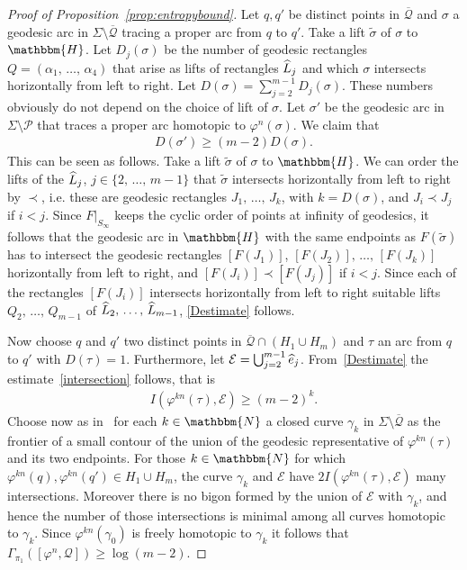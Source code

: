 \documentclass[AHL,Unicode,longabstracts,published]{cedram}
\newcommand{\N}{\mathbbm{N}}
\newcommand{\Hy}{\mathbbm{H}}
\newcommand{\clP}{\mathcal{P}}
\newcommand{\clQ}{\mathcal{Q}}
\newcommand{\clE}{\mathcal{E}}
\newcounter{claim}
\let\oldhat\hat
\renewcommand*{\hat}[1]{\mathchoice{\widehat{#1}}{\widehat{#1}}{\oldhat{#1}}{\oldhat{#1}}}
\begin{document}
\begin{proof}[Proof of Proposition~\ref{prop:entropybound}]
Let $q, q'$ be distinct points in $\overline{\clQ}$ and $\sigma$ a geodesic arc in $\Sigma \setminus \overline{\clQ}$ tracing a proper arc from $q$ to $q'$. Take a lift $\widetilde{\sigma}$ of $\sigma$ to $\Hy$. Let $D_j(\sigma)$ be the number of geodesic rectangles $Q=(\alpha_1,\, \ldots,\, \alpha_4)$ that arise as lifts of rectangles $\hat{L}_j$ and which $\sigma$ intersects horizontally from left to right. Let $D(\sigma) = \sum_{j=2}^{m-1} D_j(\sigma)$. These numbers obviously do not depend on the choice of lift of $\sigma$. Let $\sigma'$ be the geodesic arc in $\Sigma \setminus \clP$ that traces a proper arc homotopic to $\varphi^n(\sigma)$. We claim that
\begin{align}\label{Destimate}
D(\sigma') \geq (m-2)D(\sigma).
\end{align}
This can be seen as follows. Take a lift $\widetilde{\sigma}$ of $\sigma$ to $\Hy$. We can order the lifts of the $\hat{L}_j$, $j\in \{2,\, \ldots,\, m-1\}$ that $\widetilde{\sigma}$ intersects horizontally from left to right by $\prec$, i.e. these are geodesic rectangles $J_1,\, \ldots,\, J_k$, with $k=D(\sigma)$, and $J_i \prec J_j$ if $i<j$. Since $F|_{S_{\infty}}$ keeps the cyclic order of points at infinity of geodesics, it follows that the geodesic arc in $\Hy$ with the same endpoints as $F(\widetilde\sigma)$ has to intersect the geodesic rectangles $[F(J_1)]$, $[F(J_2)],\, \ldots,\, [F(J_k)]$ horizontally from left to right, and $[F(J_i)] \prec [F(J_j)]$ if $i< j$. Since each of the rectangles $[F(J_i)]$ intersects horizontally from left to right suitable lifts $Q_2, \,\ldots,\, Q_{m-1}$ of $\hat{L}_2,\, \ldots,\, \hat{L}_{m-1}$, \eqref{Destimate} follows.

Now choose $q$ and $q'$ two distinct points in $\overline{\clQ} \cap (H_1 \cup H_m)$ and $\tau$ an arc from $q$ to $q'$ with $D(\tau) = 1$. Furthermore, let $\clE = \bigcup_{j=2}^{m-1} \hat{e}_j$. From~\eqref{Destimate} the estimate~\eqref{intersection} follows, that is
\begin{align*}
I(\varphi^{kn}(\tau), \clE) \geq (m-2)^k.
\end{align*}
Choose now as in~\cite{FranksHandel1988} for each $k\in \N$ a closed curve $\gamma_k$ in $\Sigma\setminus \overline{\clQ}$ as the frontier of a small contour of the union of the geodesic representative of $\varphi^{kn}(\tau)$ and its two endpoints. For those $k \in \N$ for which $\varphi^{kn}(q), \varphi^{kn}(q') \in H_1 \cup H_m$, the curve $\gamma_k$ and $\clE$ have $2I(\varphi^{kn}(\tau), \clE)$ many intersections. Moreover there is no bigon formed by the union of $\clE$ with $\gamma_k$, and hence the number of those intersections is minimal among all curves homotopic to $\gamma_k$. Since $\varphi^{kn}(\gamma_0)$ is freely homotopic to $\gamma_k$ it follows that $\Gamma_{\pi_1}([\varphi^n, \clQ]) \geq \log(m-2)$.
\end{proof}




\end{document}
